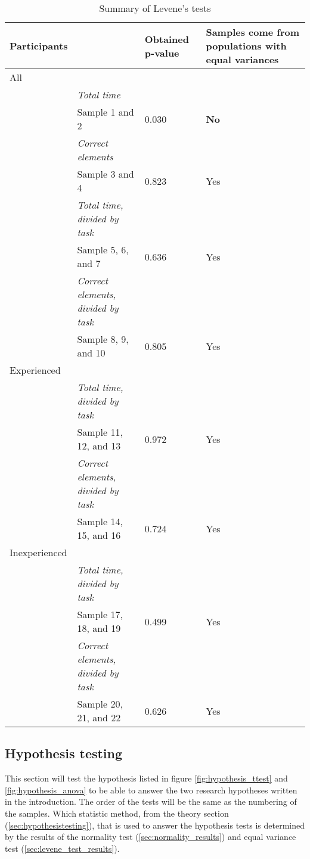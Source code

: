 \begin{longtable}{p{}|p{}|p{}|p{}}
	\caption[Summary, Levene's tests]{Summary of Levene's tests} \label{tab:levenestest_summary} \\
	 Participants & & Obtained p-value & Samples come from populations with equal variances \\ \hline
	 All & & & \\
	 & \textit{Total time} & & \\
	& Sample 1 and 2 & 0.030 & \textbf{No}  \\ 
	& \textit{Correct elements} & & \\
	& Sample 3 and 4 &0.823& Yes   \\ 
	& \textit{Total time, divided by task}& & \\
	& Sample 5, 6, and 7 & 0.636 & Yes \\ 
	& \textit{Correct elements, divided by task} & & \\
	& Sample 8, 9, and 10 & 0.805  & Yes  \\ \hline
	Experienced & & & \\
	& \textit{Total time, divided by task} & & \\
	& Sample 11, 12, and 13 & 0.972 & Yes  \\ 
	& \textit{Correct elements, divided by task} & & \\
	& Sample 14, 15, and 16 & 0.724 & Yes \\ \hline
	Inexperienced & & & \\
	& \textit{Total time, divided by task} & & \\
	& Sample 17, 18, and 19 & 0.499  & Yes  \\ 
	& \textit{Correct elements, divided by task} & & \\
	& Sample 20, 21, and 22 & 0.626 & Yes \\ \hline
\end{longtable}

\vspace{0.5cm}

\subsection{Hypothesis testing}\label{sec:hypothesis_results}
This section will test the hypothesis listed in figure \ref{fig:hypothesis_ttest} and \ref{fig:hypothesis_anova} to be able to answer the two research hypotheses written in the introduction. The order of the tests will be the same as the numbering of the samples. Which statistic method, from the theory section (\ref{sec:hypothesistesting}), that is used to answer the hypothesis tests is determined by the results of the normality test (\ref{sec:normality_results}) and equal variance test (\ref{sec:levene_test_results}).

